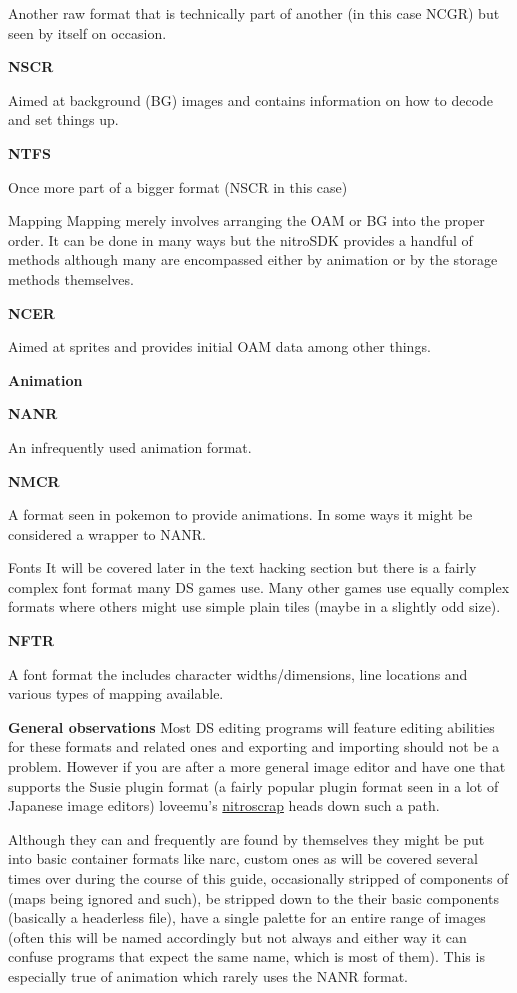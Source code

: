 \documentclass[
]{book}
\begin{document}
Another raw format that is technically part of another (in this case NCGR) but seen by itself on occasion.

\textbf{NSCR}

Aimed at background (BG) images and contains information on how to decode and set things up.

\textbf{NTFS}

Once more part of a bigger format (NSCR in this case)

Mapping Mapping merely involves arranging the OAM or BG into the proper order. It can be done in many ways but the nitroSDK provides a handful of methods although many are encompassed either by animation or by the storage methods themselves.

\textbf{NCER}

Aimed at sprites and provides initial OAM data among other things.

\textbf{Animation}

\textbf{NANR}

An infrequently used animation format.

\textbf{NMCR}

A format seen in pokemon to provide animations. In some ways it might be considered a wrapper to NANR.

Fonts It will be covered later in the text hacking section but there is a fairly complex font format many DS games use. Many other games use equally complex formats where others might use simple plain tiles (maybe in a slightly odd size).

\textbf{NFTR}

A font format the includes character widths/dimensions, line locations and various types of mapping available.

\textbf{General observations} Most DS editing programs will feature editing abilities for these formats and related ones and exporting and importing should not be a problem. However if you are after a more general image editor and have one that supports the Susie plugin format (a fairly popular plugin format seen in a lot of Japanese image editors) loveemu's \href{https://github.com/loveemu/nitroscrap/releases}{nitroscrap} heads down such a path.

Although they can and frequently are found by themselves they might be put into basic container formats like narc, custom ones as will be covered several times over during the course of this guide, occasionally stripped of components of (maps being ignored and such), be stripped down to the their basic components (basically a headerless file), have a single palette for an entire range of images (often this will be named accordingly but not always and either way it can confuse programs that expect the same name, which is most of them). This is especially true of animation which rarely uses the NANR format.
\end{document}
